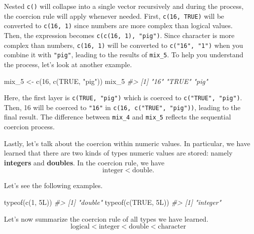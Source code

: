 \documentclass[
]{book}
\newenvironment{Shaded}{\begin{snugshade}}{\end{snugshade}}
\newcommand{\CommentTok}[1]{\textcolor[rgb]{0.56,0.35,0.01}{\textit{#1}}}
\newcommand{\ConstantTok}[1]{\textcolor[rgb]{0.00,0.00,0.00}{#1}}
\newcommand{\DecValTok}[1]{\textcolor[rgb]{0.00,0.00,0.81}{#1}}
\newcommand{\FunctionTok}[1]{\textcolor[rgb]{0.00,0.00,0.00}{#1}}
\newcommand{\NormalTok}[1]{#1}
\newcommand{\OtherTok}[1]{\textcolor[rgb]{0.56,0.35,0.01}{#1}}
\newcommand{\StringTok}[1]{\textcolor[rgb]{0.31,0.60,0.02}{#1}}
\begin{document}
Nested \texttt{c()} will collapse into a single vector recursively and during the process, the coercion rule will apply whenever needed. First, \texttt{c(16,\ TRUE)} will be converted to \texttt{c(16,\ 1)} since numbers are more complex than logical values. Then, the expression becomes \texttt{c(c(16,\ 1),\ "pig")}. Since character is more complex than numbers, \texttt{c(16,\ 1)} will be converted to \texttt{c("16",\ "1")} when you combine it with \texttt{"pig"}, leading to the results of \texttt{mix\_5}. To help you understand the process, let's look at another example.

\begin{Shaded}
\begin{Highlighting}[]
\NormalTok{mix\_5 }\OtherTok{\textless{}{-}} \FunctionTok{c}\NormalTok{(}\DecValTok{16}\NormalTok{, }\FunctionTok{c}\NormalTok{(}\ConstantTok{TRUE}\NormalTok{, }\StringTok{"pig"}\NormalTok{))}
\NormalTok{mix\_5}
\CommentTok{\#\textgreater{} [1] "16"   "TRUE" "pig"}
\end{Highlighting}
\end{Shaded}

Here, the first layer is \texttt{c(TRUE,\ "pig")} which is coerced to \texttt{c("TRUE",\ "pig")}. Then, 16 will be coerced to \texttt{"16"} in \texttt{c(16,\ c("TRUE",\ "pig"))}, leading to the final result. The difference between \texttt{mix\_4} and \texttt{mix\_5} reflects the sequential coercion process.

Lastly, let's talk about the coercion within numeric values. In particular, we have learned that there are two kinds of types numeric values are stored: namely \textbf{integers} and \textbf{doubles}. In the coercion rule, we have
\[\mbox{integer} < \mbox{double}.\]

Let's see the following examples.

\begin{Shaded}
\begin{Highlighting}[]
\FunctionTok{typeof}\NormalTok{(}\FunctionTok{c}\NormalTok{(}\DecValTok{1}\NormalTok{, 5L))}
\CommentTok{\#\textgreater{} [1] "double"}
\FunctionTok{typeof}\NormalTok{(}\FunctionTok{c}\NormalTok{(}\ConstantTok{TRUE}\NormalTok{, 5L))}
\CommentTok{\#\textgreater{} [1] "integer"}
\end{Highlighting}
\end{Shaded}

Let's now summarize the coercion rule of all types we have learned.
\[\mbox{logical} < \mbox{integer} < \mbox{double} < \mbox{character}\]
\end{document}
